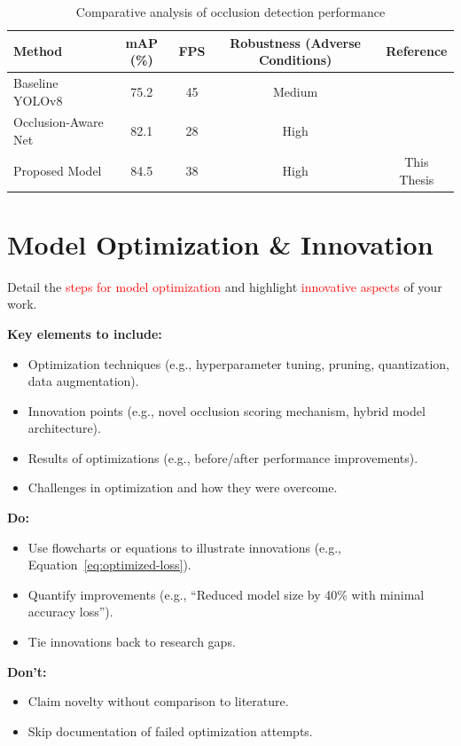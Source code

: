 \documentclass[12pt,a4paper]{report}
\theoremstyle{definition}
\theoremstyle{remark}
\begin{document}
\begin{table}[h]
    \centering
    \caption{Comparative analysis of occlusion detection performance}
    \label{tab:comparative-metrics}
    \begin{tabular}{|l|c|c|c|c|}
    \hline
    \textbf{Method} & \textbf{mAP (\%)} & \textbf{FPS} & \textbf{Robustness (Adverse Conditions)} & \textbf{Reference} \\
    \hline
    Baseline YOLOv8 & 75.2 & 45 & Medium & \cite{article1} \\
    Occlusion-Aware Net & 82.1 & 28 & High & \cite{conference1} \\
    Proposed Model & 84.5 & 38 & High & This Thesis \\
    \hline
    \end{tabular}
\end{table}

\section{Model Optimization \& Innovation}
\label{sec:model-optimization}

Detail the \textcolor{red}{steps for model optimization} and highlight \textcolor{red}{innovative aspects} of your work.

\noindent \textbf{Key elements to include:}
\begin{itemize}
    \item Optimization techniques (e.g., hyperparameter tuning, pruning, quantization, data augmentation).
    \item Innovation points (e.g., novel occlusion scoring mechanism, hybrid model architecture).
    \item Results of optimizations (e.g., before/after performance improvements).
    \item Challenges in optimization and how they were overcome.
\end{itemize}

\noindent \textbf{Do:}
\begin{itemize}
    \item Use flowcharts or equations to illustrate innovations (e.g., Equation~\ref{eq:optimized-loss}).
    \item Quantify improvements (e.g., ``Reduced model size by 40\% with minimal accuracy loss'').
    \item Tie innovations back to research gaps.
\end{itemize}

\noindent \textbf{Don’t:}
\begin{itemize}
    \item Claim novelty without comparison to literature.
    \item Skip documentation of failed optimization attempts.
\end{itemize}
\end{document}
